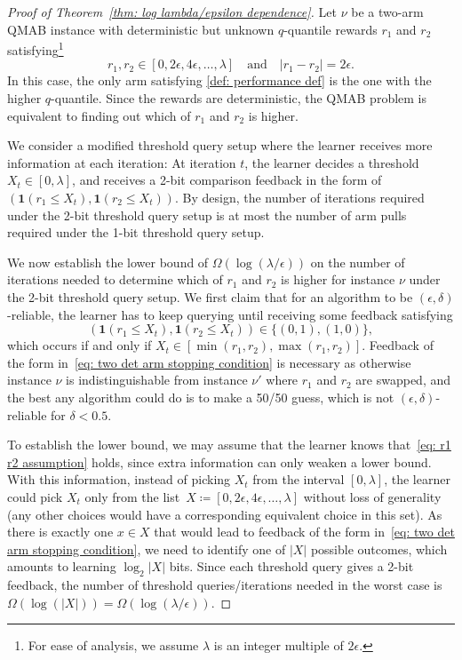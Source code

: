 \begin{proof}[Proof of Theorem~\ref{thm: log lambda/epsilon dependence}]
    Let $\nu$ be a two-arm QMAB instance with deterministic but unknown $q$-quantile rewards $r_1$ and $r_2$
satisfying\footnote{For ease of analysis, we assume $\lambda$ is an integer multiple of $2 \epsilon$.}
\begin{equation}
\label{eq: r1 r2 assumption}
    r_1, r_2 \in  
    \left[0, 2\epsilon, 4 \epsilon, \ldots, \lambda \right]
    \quad
    \text{and}
    \quad
     |r_1- r_2| = 2 \epsilon.
\end{equation}
In this case, the only arm satisfying \eqref{def: performance def} is the one with the higher $q$-quantile. Since the rewards are deterministic, the QMAB problem is equivalent to finding out which of $r_1$ and $r_2$ is higher.

We consider a modified threshold query setup where the learner receives more information at each iteration: At iteration $t$, the learner decides a threshold $X_t \in [0, \lambda]$, and receives a 2-bit comparison feedback in the form of $(\mathbf{1}(r_1 \le X_t), \mathbf{1}(r_2 \le X_t))$.
By design, the number of iterations
required under the 2-bit threshold query setup is at most the number of arm pulls required under the 1-bit threshold query setup.

We now establish the lower bound of $\Omega(\log(\lambda/\epsilon))$ on the number of iterations needed to determine which of $r_1$ and $r_2$ is higher for instance $\nu$ under the 2-bit threshold query setup.
We first claim that for an algorithm to be $(\epsilon, \delta)$-reliable, the learner has to keep querying until receiving some feedback satisfying
\begin{equation}
    \label{eq: two det arm stopping condition}
    (\mathbf{1}(r_1 \le X_t), \mathbf{1}(r_2 \le X_t)) \in \{ (0, 1) ,(1, 0) \},
\end{equation}
which occurs if and only if 
$X_t \in [\min(r_1, r_2), \max(r_1, r_2)]$.
Feedback of the form in~\eqref{eq: two det arm stopping condition} 
is necessary as otherwise instance $\nu$ is indistinguishable from instance $\nu'$ where $r_1$ and $r_2$ are swapped, and the best any algorithm could do is to make a 50/50 guess, which is not $(\epsilon, \delta)$-reliable for $\delta < 0.5$.


To establish the lower bound, we may assume that the learner knows that~\eqref{eq: r1 r2 assumption} holds, since extra information can only weaken a lower bound. With this information, instead of picking $X_t$ from the interval $[0, \lambda]$, the learner could pick $X_t$ only from the list~$X \coloneqq \left[0, 2\epsilon, 4 \epsilon, \ldots, \lambda\right]$ without loss of generality (any other choices would have a corresponding equivalent choice in this set).  
As there is exactly one $x \in X$ that would lead to feedback of the form in~\eqref{eq: two det arm stopping condition}, we need to identify one of $|X|$ possible outcomes, which amounts to learning $\log_2 |X|$ bits.
Since each threshold query gives a 2-bit feedback, the number of threshold queries/iterations needed in the worst case is $\Omega(\log(|X|)) =  \Omega(\log(\lambda/\epsilon))$.
\end{proof}

